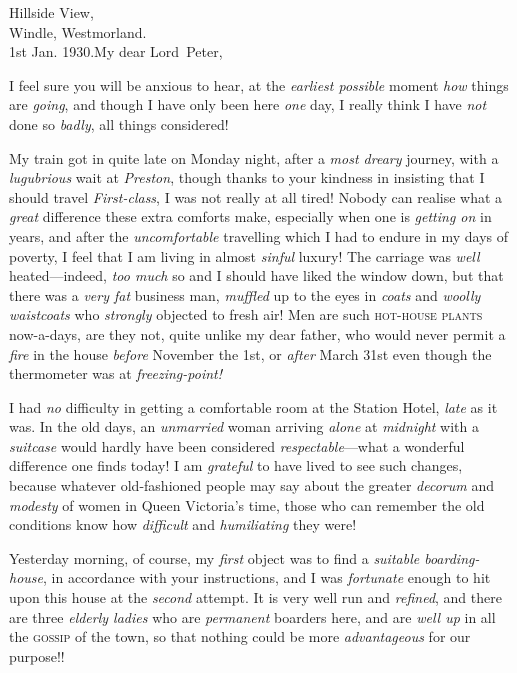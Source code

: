 \begin{mail}{Hillside View,\\Windle, Westmorland.\\1st Jan. 1930.}{My dear Lord~Peter,}

I feel sure you will be anxious to hear, at the \emph{earliest possible} moment \emph{how} things are \emph{going}, and though I have only been here \emph{one} day, I really think I have \emph{not} done so \emph{badly}, all things considered!

My train got in quite late on Monday night, after a \emph{most dreary} journey, with a \emph{lugubrious} wait at \emph{Preston}, though thanks to your kindness in insisting that I should travel \emph{First-class}, I was not really at all tired! Nobody can realise what a \emph{great} difference these extra comforts make, especially when one is \emph{getting on} in years, and after the \emph{uncomfortable} travelling which I had to endure in my days of poverty, I feel that I am living in almost \emph{sinful} luxury! The carriage was \emph{well} heated—indeed, \emph{too much} so and I should have liked the window down, but that there was a \emph{very fat} business man, \emph{muffled} up to the eyes in \emph{coats} and \emph{woolly waistcoats} who \emph{strongly} objected to fresh air! Men are such \textsc{hot-house plants} now-a-days, are they not, quite unlike my dear father, who would never permit a \emph{fire} in the house \emph{before} November the 1st, or \emph{after} March 31st even though the thermometer was at \emph{freezing-point!}

I had \emph{no} difficulty in getting a comfortable room at the Station Hotel, \emph{late} as it was. In the old days, an \emph{unmarried} woman arriving \emph{alone} at \emph{midnight} with a \emph{suitcase} would hardly have been considered \emph{respectable}—what a wonderful difference one finds today! I am \emph{grateful} to have lived to see such changes, because whatever old-fashioned people may say about the greater \emph{decorum} and \emph{modesty} of women in Queen Victoria's time, those who can remember the old conditions know how \emph{difficult} and \emph{humiliating} they were!

Yesterday morning, of course, my \emph{first} object was to find a \emph{suitable boarding-house}, in accordance with your instructions, and I was \emph{fortunate} enough to hit upon this house at the \emph{second} attempt. It is very well run and \emph{refined}, and there are three \emph{elderly ladies} who are \emph{permanent} boarders here, and are \emph{well up} in all the \textsc{gossip} of the town, so that nothing could be more \emph{advantageous} for our purpose!!


\end{mail}
